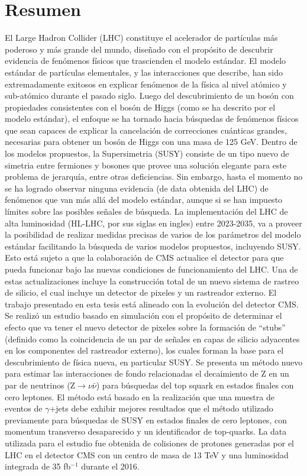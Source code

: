 \documentclass[12pt,twoside,openany]{book}
\begin{document}
\chapter*{Resumen}

El Large Hadron Collider (LHC) constituye el acelerador de part\'iculas m\'as poderoso y m\'as grande del mundo, dise\~nado con el prop\'osito de descubrir evidencia de fen\'omenos f\'isicos que trascienden el modelo est\'andar. El modelo est\'andar de part\'iculas elementales, y las interacciones que describe, han sido extremadamente exitosos en explicar fen\'omenos de la f\'isica al nivel at\'omico y sub-at\'omico durante el pasado siglo. Luego del descubrimiento de un bos\'on con propiedades consistentes con el bos\'on de Higgs (como se ha descrito por el modelo est\'andar), el enfoque se ha tornado hacia b\'usquedas de fen\'omenos f\'isicos que sean capaces de explicar la cancelaci\'on de correcciones cu\'anticas grandes, necesarias para obtener un bos\'on de Higgs con una masa de 125 GeV. Dentro de los modelos propuestos, la Supersimetria (SUSY) consiste de un tipo nuevo de simetria entre fermiones y bosones que provee una soluci\'on elegante para este problema de jerarqu\'ia, entre otras deficiencias. Sin embargo, hasta el momento no se ha logrado observar ninguna evidencia (de data obtenida del LHC) de fen\'omenos que van m\'as all\'a del modelo est\'andar, aunque si se han impuesto l\'imites sobre las posibles se\~nales de b\'usqueda. La implementaci\'on del LHC de alta luminosidad (HL-LHC, por sus siglas en ingles) entre 2023-2035, va a proveer la posibilidad de realizar medidas precisas de varios de los par\'ametros del modelo est\'andar facilitando la b\'usqueda de varios modelos propuestos, incluyendo SUSY. Esto est\'a sujeto a que la colaboraci\'on de CMS actualice el detector para que pueda funcionar bajo las nuevas condiciones de funcionamiento del LHC. Una de estas actualizaciones incluye la construcci\'on total de un nuevo sistema de rastreo de silicio, el cual incluye un detector de pixeles y un rastreador externo. El trabajo presentado en esta tesis est\'a alineado con la evoluci\'on del detector CMS. Se realiz\'o un estudio basado en simulaci\'on con el prop\'osito de determinar el efecto que va tener el nuevo detector de pixeles sobre la formaci\'on de ``stubs'' (definido como la coincidencia de un par de se\~nales en capas de silicio adyacentes en los componentes del rastreador externo), los cuales forman la base para el descubrimiento de f\'isica nueva, en particular SUSY. Se presenta un m\'etodo nuevo para estimar las interacciones de fondo relacionadas el decaimiento de Z en un par de neutrinos (Z$\rightarrow \nu\bar{\nu}$) para b\'usquedas del top squark en estados finales con cero leptones. El m\'etodo est\'a basado en la realizaci\'on que una muestra de eventos de $\gamma$+jets debe exhibir mejores resultados que el m\'etodo utilizado previamente para b\'usquedas de SUSY en estados finales de cero leptones, con momentum transverso desaparecido y un identificador de top-quarks. La data utilizada para el estudio fue obtenida de colisiones de protones generadas por el LHC en el detector CMS con un centro de masa de 13 TeV y una luminosidad integrada de 35 fb$^{-1}$ durante el 2016.
\end{document}
